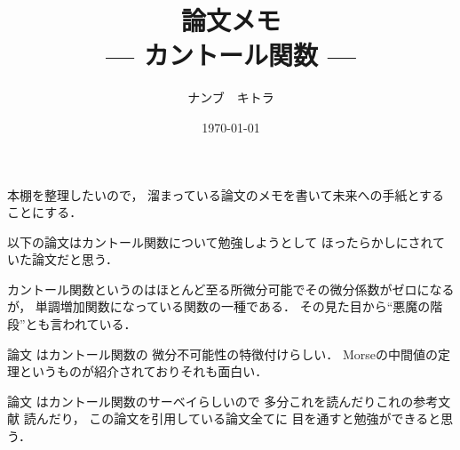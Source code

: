 \documentclass[leqno, a4paper, 12pt]{jsarticle}
\title{論文メモ
\large{\\--- カントール関数 ---}
}
\author{ナンブ　キトラ}
\date{\today}
\begin{document}
\maketitle

本棚を整理したいので，
溜まっている論文のメモを書いて未来への手紙とすることにする．

以下の論文はカントール関数について勉強しようとして
ほったらかしにされていた論文だと思う．

カントール関数というのはほとんど至る所微分可能でその微分係数がゼロになるが，
単調増加関数になっている関数の一種である．
その見た目から``悪魔の階段''とも言われている．


論文
\cite{MR0327992}
はカントール関数の
微分不可能性の特徴付けらしい．
Morseの中間値の定理というものが紹介されておりそれも面白い．

論文
\cite{MR2195181}
はカントール関数のサーベイらしいので
多分これを読んだりこれの参考文献
読んだり，
この論文を引用している論文全てに
目を通すと勉強ができると思う．


\nocite{*}


\end{document}
